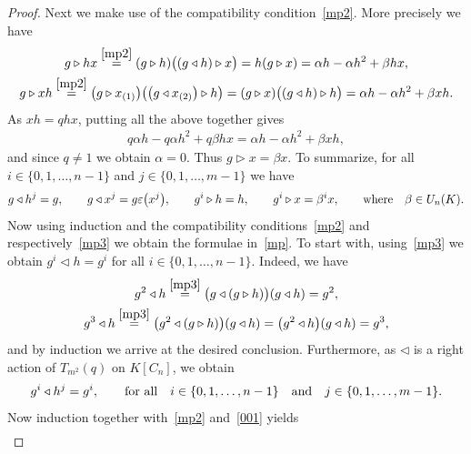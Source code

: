 \documentclass[11pt]{article}
\numberwithin{equation}{section}
\begin{document}
\begin{proof}
Next we make use of the compatibility condition~\eqref{mp2}. More precisely we have
\begin{gather*}
g \triangleright hx \stackrel{\eqref{mp2}} {=} (g \triangleright h) \big((g \triangleleft h) \triangleright x\big)
= h (g \triangleright x) = \alpha h - \alpha h^{2} + \beta hx,\\
g \triangleright xh \stackrel{\eqref{mp2}} {=} \big(g \triangleright x_{(1)}\big) \big(\big(g \triangleleft x_{(2)}\big) \triangleright h\big)
= (g \triangleright x) \big((g \triangleleft h) \triangleright h\big) = \alpha h - \alpha h^{2} + \beta xh.
\end{gather*}
As $xh = q hx$, putting all the above together gives
\begin{gather*}
q\alpha h - q\alpha h^{2} + q\beta hx = \alpha h - \alpha h^{2} + \beta xh,
\end{gather*}
and since $q \neq 1$ we obtain $\alpha = 0$. Thus $g \triangleright x = \beta x$. To summarize, for all $i \in \{0, 1,\dots, n-1\}$ and $j \in \{0, 1,\dots, m-1\}$ we have
\begin{gather*}
g \triangleleft h^{j} = g, \qquad g \triangleleft x^{j} = g \varepsilon\big(x^{j}\big), \qquad g^{i} \triangleright h = h, \qquad g^{i} \triangleright x = \beta^{i} x,\qquad {\rm where} \quad \beta \in U_{n}(K).
\end{gather*}
Now using induction and the compatibility conditions~\eqref{mp2} and respectively~\eqref{mp3} we obtain the formulae in~\eqref{mp}. To start with, using~\eqref{mp3} we obtain $g^{i} \triangleleft h = g^{i}$ for all $i \in \{0, 1,\dots, n-1\}$. Indeed, we have
\begin{gather*}
g^{2} \triangleleft h \stackrel{\eqref{mp3}} = \big(g \triangleleft (g \triangleright h)\big) (g \triangleleft h)= g^{2},\\
g^{3} \triangleleft h \stackrel{\eqref{mp3}} = \big(g^{2} \triangleleft (g \triangleright h)\big) (g \triangleleft h)= \big(g^{2} \triangleleft h\big)(g \triangleleft h) = g^{3},
\end{gather*}
and by induction we arrive at the desired conclusion. Furthermore, as $\triangleleft$ is a right action of $T_{m^{2}}(q)$ on $K[C_{n}]$, we obtain
\begin{gather}\label{001}
g^{i} \triangleleft h^{j} = g^{i},\qquad \text{for all} \quad i \in \{0, 1,\dots, n-1\} \quad {\rm and}\quad j \in \{0, 1,\dots, m-1\}.
\end{gather}
Now induction together with~\eqref{mp2} and~\eqref{001} yields
\begin{gather}\label{002}

\end{gather}
\end{proof}
\end{document}
